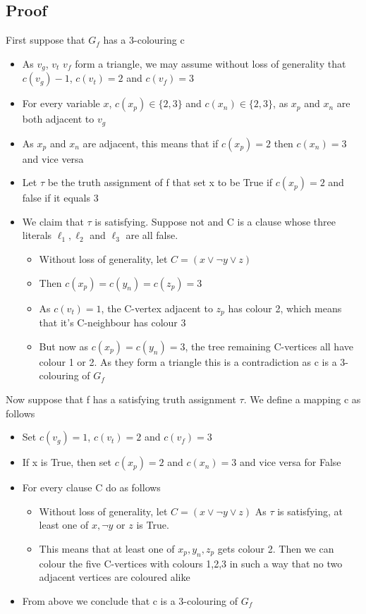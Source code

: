 \documentclass{article}[18pt]
\begin{document}
\subsection{Proof}
First suppose that $G_f$ has a 3-colouring c
\begin{itemize}
	\item As $v_g$, $v_t$ $v_f$ form a triangle, we may assume without loss of generality that $c(v_g)-1$, $c(v_t)=2$ and $c(v_f)=3$
	\item For every variable $x$, $c(x_p)\in \{2,3\}$ and $c(x_n)\in \{2,3\}$, as $x_p$ and $x_n$ are both adjacent to $v_g$
	\item As $x_p$ and $x_n$ are adjacent, this means that if $c(x_p)=2$ then $c(x_n)=3$ and vice versa
	\item Let $\tau$ be the truth assignment of f that set x to be True if $c(x_p)=2$ and false if it equals 3
	\item We claim that $\tau$ is satisfying. Suppose not and C is a clause whose three literals $\ell_1,\ell_2$ and $\ell_3$ are all false.
	\begin{itemize}
		\item Without loss of generality, let $C=(x\lor \lnot y \lor z)$
		\item Then $c(x_p)=c(y_n)=c(z_p)=3$
		\item As $c(v_t)=1$, the C-vertex adjacent to $z_p$ has colour 2, which means that it's C-neighbour has colour 3
		\item But now as $c(x_p)=c(y_n)=3$, the tree remaining C-vertices all have colour 1 or 2. As they form a triangle this is a contradiction as c is a 3-colouring of $G_f$
	\end{itemize}
\end{itemize}
Now suppose that f has a satisfying truth assignment $\tau$. We define a mapping c as follows
\begin{itemize}
	\item Set $c(v_g)=1$, $c(v_t)=2$ and $c(v_f)=3$
	\item If x is True, then set $c(x_p)=2$ and $c(x_n)=3$ and vice versa for False
	\item For every clause C do as follows
	\begin{itemize}
		\item Without loss of generality, let $C=(x\lor\lnot y\lor z)$ As $\tau$ is satisfying, at least one of $x,\lnot y$ or $z$ is True.
		\item This means that at least one of $x_p,y_n,z_p$ gets colour 2. Then we can colour the five C-vertices with colours 1,2,3 in such a way that no two adjacent vertices are coloured alike
	\end{itemize}
	\item From above we conclude that c is a 3-colouring of $G_f$
\end{itemize}
\end{document}
